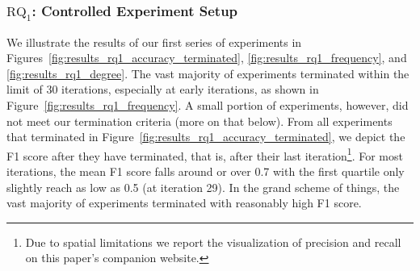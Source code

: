 \documentclass[sigconf]{acmart}
\begin{document}
	\subsubsection{$\text{RQ}_1$: Controlled Experiment Setup}
	We illustrate the results of our first series of experiments in Figures~\ref{fig:results_rq1_accuracy_terminated}, \ref{fig:results_rq1_frequency}, and \ref{fig:results_rq1_degree}. The vast majority of experiments terminated within the limit of 30 iterations, especially at early iterations, as shown in Figure~\ref{fig:results_rq1_frequency}. A small portion of experiments, however, did not meet our termination criteria (more on that below). From all experiments that terminated in Figure~\ref{fig:results_rq1_accuracy_terminated}, we depict the F1 score after they have terminated, that is, after their last iteration\footnote{Due to spatial limitations we report the visualization of precision and recall on this paper's companion website.}. For most iterations, the mean F1 score falls around or over 0.7 with the first quartile  only slightly reach as low as 0.5 (at iteration 29).  In the grand scheme of things, the vast majority of experiments terminated with reasonably high F1 score. 
\end{document}
